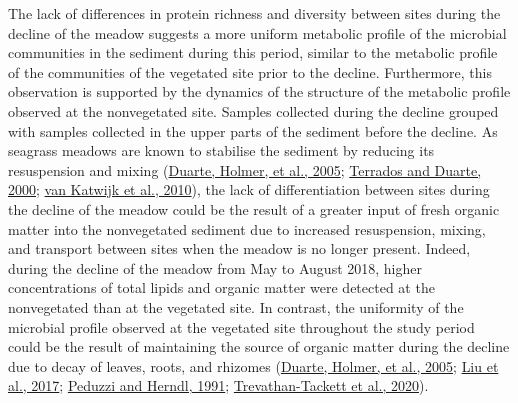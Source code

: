 \documentclass[
  12 pt,
]{book}
\begin{document}
The lack of differences in protein richness and diversity between sites during the decline of the meadow suggests a more uniform metabolic profile of the microbial communities in the sediment during this period, similar to the metabolic profile of the communities of the vegetated site prior to the decline. Furthermore, this observation is supported by the dynamics of the structure of the metabolic profile observed at the nonvegetated site. Samples collected during the decline grouped with samples collected in the upper parts of the sediment before the decline. As seagrass meadows are known to stabilise the sediment by reducing its resuspension and mixing (\protect\hyperlink{ref-Duarte2005}{Duarte, Holmer, et al., 2005}; \protect\hyperlink{ref-Terrados2000}{Terrados and Duarte, 2000}; \protect\hyperlink{ref-vanKatwijk2010}{van Katwijk et al., 2010}), the lack of differentiation between sites during the decline of the meadow could be the result of a greater input of fresh organic matter into the nonvegetated sediment due to increased resuspension, mixing, and transport between sites when the meadow is no longer present. Indeed, during the decline of the meadow from May to August 2018, higher concentrations of total lipids and organic matter were detected at the nonvegetated than at the vegetated site. In contrast, the uniformity of the microbial profile observed at the vegetated site throughout the study period could be the result of maintaining the source of organic matter during the decline due to decay of leaves, roots, and rhizomes (\protect\hyperlink{ref-Duarte2005}{Duarte, Holmer, et al., 2005}; \protect\hyperlink{ref-Liu2017}{Liu et al., 2017}; \protect\hyperlink{ref-Peduzzi1991}{Peduzzi and Herndl, 1991}; \protect\hyperlink{ref-Trevathan-Tackett2020}{Trevathan-Tackett et al., 2020}).
\end{document}
